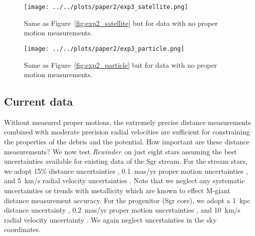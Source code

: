 \documentclass[letterpaper,12pt,preprint]{aastex}
\newcommand{\rewinder}{\emph{Rewinder}}
\begin{document}
\begin{figure}[!ht]
\begin{center}
\texttt{[image: ../../plots/paper2/exp3\_satellite.png]}
\caption{ Same as Figure~\ref{fig:exp2_satellite} but for data with no proper motion measurements.  }\label{fig:exp3_satellite}
\end{center}
\end{figure}

\begin{figure}[!ht]
\begin{center}
\texttt{[image: ../../plots/paper2/exp3\_particle.png]}
\caption{ Same as Figure~\ref{fig:exp2_particle} but for data with no proper motion measurements.  }\label{fig:exp3_particle}
\end{center}
\end{figure}

\subsection{Current data}\label{sec:exp4}
Without measured proper motions, the extremely precise distance measurements combined with moderate precision radial velocities are sufficient for constraining the properties of the debris and the potential. How important are these distance measurements? We now test \rewinder\, on just eight stars assuming the best uncertainties available for existing data of the Sgr stream. For the stream stars, we adopt 15\% distance uncertainties \citep[typical for M-giants, e.g.,][]{majewski04}, 0.1~mas/yr proper motion uncertainties \citep{koposov13}, and 5~km/s radial velocity uncertainties \citep{majewski04}. Note that we neglect any systematic uncertainties or trends with metallicity which are known to effect M-giant distance measurement accuracy. For the progenitor (Sgr core), we adopt a 1~kpc distance uncertainty \citep{kunder09}, 0.2~mas/yr proper motion uncertainties \citep{pryor10}, and 10~km/s radial velocity uncertainty \citep{frinchaboy12}. We again neglect uncertainties in the sky coordinates.
\end{document}
